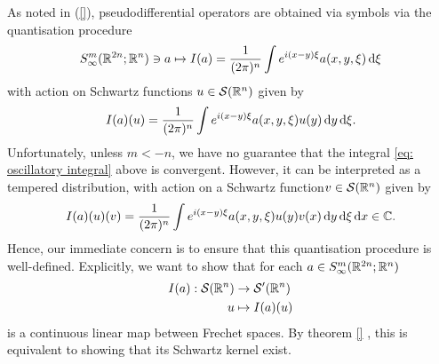 \documentclass[12pt]{article}
\begin{document}
As noted in (\ref{}), pseudodifferential operators are obtained via symbols via the quantisation procedure
\begin{align}
    S^{m}_\infty(\R^{2n}; \R^n) \ni a \mapsto I(a) = \frac{1}{(2\pi)^n} \int e^{i(x- y)\xi} a(x, y, \xi) \d[\xi]
\end{align}
with action on Schwartz functions $u \in \sch(\R^n)$ given by 
\begin{align} \label{eq: oscillatory integral}
    I(a)(u) =  \frac{1}{(2\pi)^n} \int e^{i(x- y)\xi} a(x, y, \xi) u(y) \d[y] \d[\xi]. 
\end{align}
Unfortunately, unless $m < -n$, we have no guarantee that the integral \ref{eq: oscillatory integral} above is convergent. However, it can be interpreted as a tempered distribution, with action on a Schwartz function$ v \in \sch(\R^n)$ given by 
\begin{align}
    I(a)(u)(v) = \frac{1}{(2\pi)^n} \int e^{i(x- y)\xi} a(x, y, \xi) u(y) v(x) \d[y] \d[\xi] \d[x] \in \C.  
\end{align}
Hence, our immediate concern is to ensure that this quantisation procedure is well-defined. Explicitly, we want to show that for each $a \in S^{m}_\infty(\R^{2n}; \R^n)$
\begin{align*}
    I(a) : \sch(\R^n) & \to \sch'(\R^n) \\
    u &\mapsto I(a)(u) 
\end{align*}
is a continuous linear map between Frechet spaces. By theorem \ref{} , this is equivalent to showing that its Schwartz kernel exist. 

\end{document}

